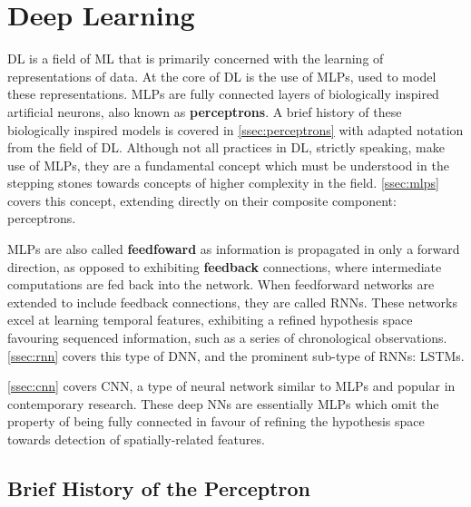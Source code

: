 \section{Deep Learning\label{sec:DL}}
\Gls{DL} is a field of \gls{ML} that is primarily concerned with the learning of
representations of data. At the core of \gls{DL} is the use of \glspl{MLP}, used
to model these representations. \Glspl{MLP} are fully connected layers of
biologically inspired artificial neurons, also known as \textbf{perceptrons}. A
brief history of these biologically inspired models is covered in
\autoref{ssec:perceptrons} with adapted notation from the field of \gls{DL}.
Although not all practices in \gls{DL}, strictly speaking, make use of
\glspl{MLP}, they are a fundamental concept which must be understood in the
stepping stones towards concepts of higher complexity in the field.
\autoref{ssec:mlps} covers this concept, extending directly on their composite
component: perceptrons.

\Glspl{MLP} are also called \textbf{feedfoward} as information is propagated in only a forward direction, as opposed to exhibiting \textbf{feedback} connections, where intermediate computations are fed back into the network. When feedforward networks are extended to include feedback connections, they are called \glspl{RNN}. These networks excel at learning temporal features, exhibiting a refined hypothesis space favouring sequenced information, such as a series of chronological observations. \autoref{ssec:rnn} covers this type of \gls{DNN}, and the prominent sub-type of \glspl{RNN}: \glspl{LSTM}.

\autoref{ssec:cnn} covers \gls{CNN}, a type of neural network similar to \glspl{MLP} and popular in contemporary research. These deep \glspl{NN} are essentially \glspl{MLP} which omit the property of being fully connected in favour of refining the hypothesis space towards detection of spatially-related features.


\subsection{Brief History of the Perceptron}\label{ssec:perceptrons}

